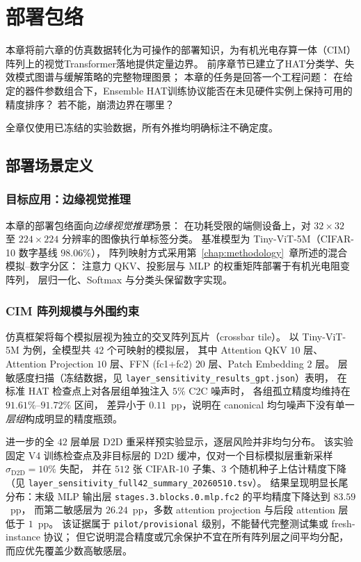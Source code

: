 \chapter{部署包络}
\label{chap:deployment-envelope}

本章将前六章的仿真数据转化为可操作的部署知识，为有机光电存算一体（CIM）阵列上的视觉Transformer落地提供定量边界。
前序章节已建立了HAT分类学、失效模式图谱与缓解策略的完整物理图景；
本章的任务是回答一个工程问题：
在给定的器件参数组合下，Ensemble HAT训练协议能否在未见硬件实例上保持可用的精度排序？
若不能，崩溃边界在哪里？

全章仅使用已冻结的实验数据，所有外推均明确标注不确定度。

\section{部署场景定义}
\label{sec:deployment-scenario}

\subsection{目标应用：边缘视觉推理}

本章的部署包络面向\emph{边缘视觉推理}场景：
在功耗受限的端侧设备上，对 $32\times32$ 至 $224\times224$ 分辨率的图像执行单标签分类。
基准模型为 Tiny-ViT-5M（CIFAR-10 数字基线 $98.06\%$），
阵列映射方式采用第~\ref{chap:methodology}~章所述的混合模拟--数字分区：
注意力 QKV、投影层与 MLP 的权重矩阵部署于有机光电阻变阵列，
层归一化、Softmax 与分类头保留数字实现。

\subsection{CIM 阵列规模与外围约束}

仿真框架将每个模拟层视为独立的交叉阵列瓦片（crossbar tile）。
以 Tiny-ViT-5M 为例，全模型共 $42$ 个可映射的模拟层，
其中 Attention QKV $10$ 层、Attention Projection $10$ 层、FFN (fc1+fc2) $20$ 层、Patch Embedding $2$ 层。
层敏感度扫描（冻结数据，见 \texttt{layer\_sensitivity\_results\_gpt.json}）表明，
在标准 HAT 检查点上对各层组单独注入 $5\%$ C2C 噪声时，
各组孤立精度均维持在 $91.61\%$--$91.72\%$ 区间，
差异小于 $0.11$~pp，说明在 canonical 均匀噪声下没有单一\emph{层组}构成明显的精度瓶颈。

进一步的全 $42$ 层单层 D2D 重采样预实验显示，逐层风险并非均匀分布。
该实验固定 V4 训练检查点及非目标层的 D2D 缓冲，仅对一个目标模拟层重新采样 $\sigma_{\mathrm{D2D}}=10\%$ 失配，
并在 $512$ 张 CIFAR-10 子集、$3$ 个随机种子上估计精度下降（见
\texttt{layer\_sensitivity\_full42\_summary\_20260510.tsv}）。
结果呈现明显长尾分布：末级 MLP 输出层 \texttt{stages.3.blocks.0.mlp.fc2} 的平均精度下降达到 $83.59$~pp，
而第二敏感层为 $26.24$~pp，多数 attention projection 与后段 attention 层低于 $1$~pp。
该证据属于 \texttt{pilot/provisional} 级别，不能替代完整测试集或 fresh-instance 协议；
但它说明混合精度或冗余保护不宜在所有阵列层之间平均分配，而应优先覆盖少数高敏感层。

